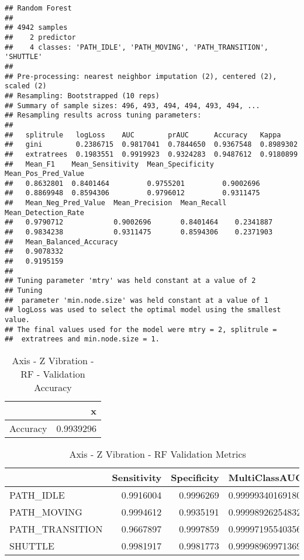 \documentclass[]{article}
\begin{document}
\begin{verbatim}
## Random Forest 
## 
## 4942 samples
##    2 predictor
##    4 classes: 'PATH_IDLE', 'PATH_MOVING', 'PATH_TRANSITION', 'SHUTTLE' 
## 
## Pre-processing: nearest neighbor imputation (2), centered (2), scaled (2) 
## Resampling: Bootstrapped (10 reps) 
## Summary of sample sizes: 496, 493, 494, 494, 493, 494, ... 
## Resampling results across tuning parameters:
## 
##   splitrule   logLoss    AUC        prAUC      Accuracy   Kappa    
##   gini        0.2386715  0.9817041  0.7844650  0.9367548  0.8989302
##   extratrees  0.1983551  0.9919923  0.9324283  0.9487612  0.9180899
##   Mean_F1    Mean_Sensitivity  Mean_Specificity  Mean_Pos_Pred_Value
##   0.8632801  0.8401464         0.9755201         0.9002696          
##   0.8869948  0.8594306         0.9796012         0.9311475          
##   Mean_Neg_Pred_Value  Mean_Precision  Mean_Recall  Mean_Detection_Rate
##   0.9790712            0.9002696       0.8401464    0.2341887          
##   0.9834238            0.9311475       0.8594306    0.2371903          
##   Mean_Balanced_Accuracy
##   0.9078332             
##   0.9195159             
## 
## Tuning parameter 'mtry' was held constant at a value of 2
## Tuning
##  parameter 'min.node.size' was held constant at a value of 1
## logLoss was used to select the optimal model using the smallest value.
## The final values used for the model were mtry = 2, splitrule =
##  extratrees and min.node.size = 1.
\end{verbatim}

\begin{table}[!h]

\caption{\label{tab:sensor-z-vib-rf-results}Axis - Z Vibration - RF - Validation Accuracy}
\centering
\begin{tabular}[t]{lr}
\toprule
  & x\\
\midrule
Accuracy & 0.9939296\\
\bottomrule
\end{tabular}
\end{table}

\begin{table}[!h]

\caption{\label{tab:sensor-z-vib-rf-results}Axis - Z Vibration - RF Validation Metrics}
\centering
\begin{tabular}[t]{lrrl}
\toprule
  & Sensitivity & Specificity & MultiClassAUC\\
\midrule
PATH\_IDLE & 0.9916004 & 0.9996269 & 0.999993401691806\\
PATH\_MOVING & 0.9994612 & 0.9935191 & 0.999989262548327\\
PATH\_TRANSITION & 0.9667897 & 0.9997859 & 0.999971955403562\\
SHUTTLE & 0.9981917 & 0.9981773 & 0.999989699713693\\
\bottomrule
\end{tabular}
\end{table}
\end{document}
